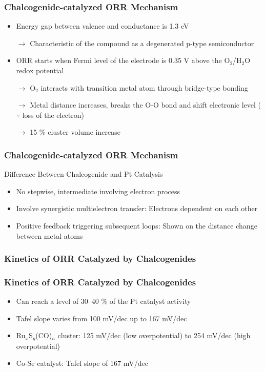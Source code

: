 \documentclass{beamer}
\begin{document}
\begin{frame}
\frametitle{Chalcogenide-catalyzed ORR Mechanism}

\begin{itemize}
\item{Energy gap between valence and conductance is \alert{1.3 eV}}
\item[$\longrightarrow$]{Characteristic of the compound as a degenerated p-type semiconductor}
\newline
\item{ORR starts when Fermi level of the electrode is 0.35 V above the O$_2$/H$_2$O redox potential}
\item[$\longrightarrow$]{O$_2$ interacts with transition metal atom through bridge-type bonding}
\item[$\longrightarrow$]{Metal distance increases, breaks the O-O bond and shift electronic level ($\because$ loss of the electron)}
\item[$\longrightarrow$]{15 \% cluster volume increase}
\end{itemize}
\end{frame}
\begin{frame}
\frametitle{Chalcogenide-catalyzed ORR Mechanism}
\begin{block}{Difference Between Chalcogenide and Pt Catalysis}
\begin{itemize}
\item{No stepwise, intermediate involving electron process}
\item{Involve synergistic multielectron transfer: Electrons dependent on each other}
\item{Positive feedback triggering subsequent loops: \newline Shown on the distance change between metal atoms}
\end{itemize}

\end{block}
\end{frame}
\subsubsection{Kinetics of ORR Catalyzed by Chalcogenides}
\begin{frame}
\frametitle{Kinetics of ORR Catalyzed by Chalcogenides}

\begin{itemize}
\item{Can reach a level of 30–40 \% of the Pt catalyst activity}
\item{Tafel slope varies from 100 mV/dec up to 167 mV/dec}
\newline
\item{\alert{Ru$_x$S$_y$(CO)$_n$ cluster}: 125 mV/dec (low overpotential) to 254 mV/dec (high overpotential)}
\item{\alert{Co-Se catalyst}: Tafel slope of 167 mV/dec }
\end{itemize}

\end{frame}
\end{document}
